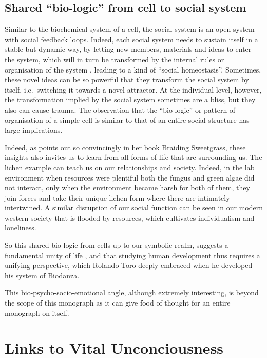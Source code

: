\documentclass[
  11pt,
]{book}
\begin{document}
\hypertarget{shared-bio-logic-from-cell-to-social-system}{%
\subsection{Shared ``bio-logic'' from cell to social system}\label{shared-bio-logic-from-cell-to-social-system}}

Similar to the biochemical system of a cell, the social system is an open system with social feedback loops. Indeed, each social system needs to sustain itself in a stable but dynamic way, by letting new members, materials and ideas to enter the system, which will in turn be transformed by the internal rules or organisation of the system \citep{capraLuisi2014}, leading to a kind of ``social homeostasis''. Sometimes, these novel ideas can be so powerful that they transform the social system by itself, i.e.~switching it towards a novel attractor. At the individual level, however, the transformation implied by the social system sometimes are a bliss, but they also can cause trauma. The observation that the ``bio-logic'' or pattern of organisation of a simple cell is similar to that of an entire social structure has large implications.

Indeed, as \citet{Kimmerer2013} points out so convincingly in her book Braiding Sweetgrass, these insights also invites us to learn from all forms of life that are surrounding us.
The lichen example can teach us on our relationships and society. Indeed, in the lab environment when resources were plentiful both the fungus and green algae did not interact, only when the environment became harsh for both of them, they join forces and take their unique lichen form where there are intimately intertwined. A similar disruption of our social function can be seen in our modern western society that is flooded by resources, which cultivates individualism and loneliness.

So this shared bio-logic from cells up to our symbolic realm, suggests a fundamental unity of life \citep{capraLuisi2014}, and that studying human development thus requires a unifying perspective, which Rolando Toro deeply embraced when he developed his system of Biodanza.

This bio-psycho-socio-emotional angle, although extremely interesting, is beyond the scope of this monograph as it can give food of thought for an entire monograph on itself.

\hypertarget{links-to-vital-unconciousness}{%
\section{Links to Vital Unconciousness}\label{links-to-vital-unconciousness}}
\end{document}
